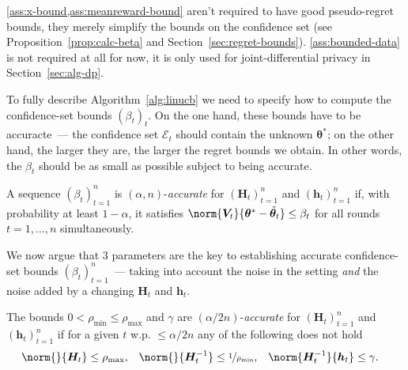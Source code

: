 \documentclass{article}
\renewcommand{\vec}[1]{\bm{#1}}
\newcommand{\inv}[1]{#1^{-1}}
\newcommand{\E}{\mathcal{E}}
\begin{document}
\cref{ass:x-bound,ass:meanreward-bound} aren't required to have good pseudo-regret bounds, they merely simplify the bounds on the confidence set (see Proposition~\ref{prop:calc-beta} and Section~\ref{sec:regret-bounds}). \cref{ass:bounded-data} is not required at all for now, it is only used for joint-differential privacy in Section~\ref{sec:alg-dp}.



To fully describe Algorithm~\ref{alg:linucb} we need to specify how to compute the confidence-set bounds $(\beta_t)_t$. On the one hand, these bounds have to be accuracte~--- the confidence set $\E_t$ should contain the unknown $\vec\theta^*$; on the other hand, the larger they are, the larger the regret bounds we obtain. 
In other words, the $\beta_t$ should be as small as possible subject to being accurate.

\begin{definition}\label{def:accurate-beta}
  A sequence $(\beta_t)_{t=1}^n$ is $(\alpha, n)$-\emph{accurate} for
  $(\vec H_t)_{t=1}^n$ and $(\vec h_t)_{t=1}^n$ if, with probability at
  least $1-\alpha$, it satisfies
  $\norm{\vec V_t}{\vec\theta^* - \tilde{\vec\theta}_t} \le \beta_t$
  for all rounds $t=1,\dotsc,n$ simultaneously.
\end{definition}

We now argue that 3 parameters are the key to establishing accurate confidence-set bounds $(\beta_t)_{t=1}^n$~--- taking into account the noise in the setting \emph{and} the noise added by a changing $\vec H_t$ and $\vec h_t$.

\begin{definition}\label{def:accurate-params}
  The bounds $0 < \rho_{\min} \le \rho_{\max}$ and $\gamma$ are
  $(\alpha/2n)$-\emph{accurate} for $(\vec H_t)_{t=1}^n$ and $(\vec h_t)_{t=1}^n$ if for a given $t$ w.p. $\leq \alpha/2n$ any of the following does not hold
  \begin{align*}
    \norm{}{\vec H_t} &\le \rho_{\max},
    &\norm{}{\inv{\vec H_t}} &\le \nicefrac{1}{\rho_{\min}},
    &\norm{\inv{\vec H_t}}{\vec h_t} &\le \gamma.
  \end{align*}
\end{definition}
\end{document}
